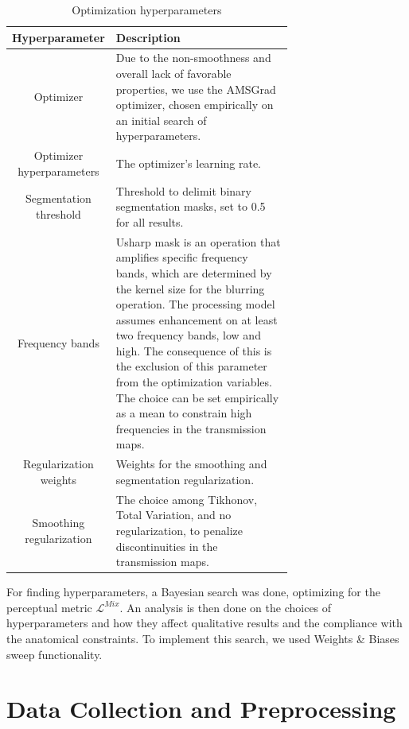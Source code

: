 \documentclass[nomenclature, english, bibtex]{kththesis}
\numberwithin{listing}{chapter}
\begin{document}
\begin{table}[H]
    \centering
    \begin{tabular}{ | c | p{0.7\linewidth}| }
        \hline
        \textbf{Hyperparameter} & \textbf{Description} \\
        \hline
        Optimizer & Due to the non-smoothness and overall lack of favorable properties, we
       use the AMSGrad \cite{reddiConvergenceAdam2019} optimizer, chosen empirically on an initial search of hyperparameters. \\
        \hline
        Optimizer hyperparameters & The optimizer's learning rate. \\
        \hline
        Segmentation threshold & Threshold to delimit binary segmentation masks, set to 0.5 for all results. \\
        \hline
        Frequency bands & Usharp mask is an operation that amplifies specific frequency bands, which are determined
        by the kernel size for the blurring operation. The processing model assumes enhancement on at least two
        frequency bands, low and high. The consequence of this is the exclusion of this parameter from the optimization
        variables. The choice can be set empirically as a mean to constrain high frequencies in the transmission maps.  \\
        \hline
        Regularization weights & Weights for the smoothing and segmentation regularization. \\
        \hline
        Smoothing regularization & The choice among Tikhonov, Total Variation, and no regularization,
        to penalize discontinuities in the transmission maps. \\
        \hline
    \end{tabular}
    \caption{Optimization hyperparameters}
    \label{tab:hyperparametersList}
\end{table}

For finding hyperparameters, a Bayesian search was done, optimizing for the perceptual metric $\mathcal{L}^{Mix}$.
An analysis is then done on the choices of hyperparameters and how they affect qualitative results and
the compliance with the anatomical constraints. To implement this search, we used Weights \& Biases \cite{wandb} sweep
functionality.

\section{Data Collection and Preprocessing}
\label{sec:dataCollection}
\end{document}
